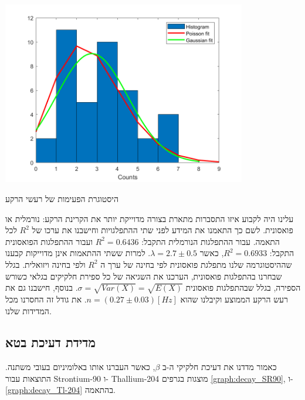 \documentclass{article}
\begin{document}
\begin{graph}[ht!]
    \centering
    \includegraphics[width=0.8\textwidth]{hist.png}
    \caption{
    היסטוגרת הפעימות של רעשי הרקע
    }
    \label{graph:backgroundNoise}
\end{graph}

עלינו היה לקבוע איזו התסברות מתארת בצורה מדוייקת יותר את הקרינת הרקע: נורמלית או פואסונית.
לשם כך התאמנו את המידע לפני שתי ההתפלגויות וחישבנו את ערכו של 
$R^2$
לכל התאמה.
עבור ההתפלגות הנורמלית התקבל:
$R^2 = 0.6436$
ועבור ההתפלגות הפואסונית התקבל:
$R^2 = 0.6933$,
כאשר
$\lambda = 2.7 \pm 0.5$.
למרות ששתי ההתאמות אינן מדוייקות קבענו שההיסטוגרמה שלנו מתפלגת פואסונית לפי בחינה של ערך ה 
$R^2$
ולפי בחינה ויזואלית. בגלל שבחרנו בהתפלגות פואסונית, הערכנו את השגיאה של כל ספירת חלקיקים בגלאי כשורש הספירה, בגלל שבהתפלגות פואסונית
$\sigma = \sqrt{Var(X)} = \sqrt{E(X)}$.
בנוסף, חישבנו גם את רעש הרקע הממוצע וקיבלנו שהוא
$n = (0.27\pm0.03) [Hz]$.
את גודל זה החסרנו מכל המדידות שלנו.

\subsection{
מדידת דעיכת בטא
}

כאמור מדדנו את דעיכת חלקיקי ה-ב
$\beta$,
כאשר העברנו אותו באלומיניום בעובי משתנה. התוצאות עבור
\textenglish{Strontium-90}
ו-
\textenglish{Thallium-204}
מוצגות בגרפים 
\ref{graph:decay_SR90},
ו-
\ref{graph:decay_Tl-204}
בהתאמה.
\end{document}
